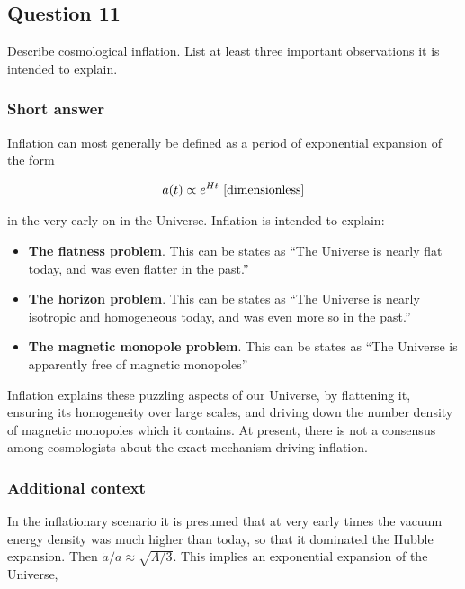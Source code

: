 \documentclass[a4paper,11pt]{article}
\begin{document}
\newpage
\subsection{Question 11}

Describe cosmological inflation. List at least three important observations it is intended to explain.

\subsubsection{Short answer}

Inflation can most generally be defined as a period of exponential expansion of the form

\begin{align*}
    a(t) \propto e^{Ht} ~ [{\rm dimensionless}]
\end{align*}

{\noindent}in the very early on in the Universe. Inflation is intended to explain:

\begin{itemize}
    \item \textbf{The flatness problem}. This can be states as ``The Universe is nearly flat today, and was even flatter in the past.'' 
    \item \textbf{The horizon problem}. This can be states as ``The Universe is nearly isotropic and homogeneous today, and was even more so in the past.''
    \item \textbf{The magnetic monopole problem}. This can be states as ``The Universe is apparently free of magnetic monopoles''
\end{itemize}

{\noindent}Inflation explains these puzzling aspects of our Universe, by flattening it, ensuring its homogeneity over large scales, and driving down the number density of magnetic monopoles which it contains. At present, there is not a consensus among cosmologists about the exact mechanism driving inflation.

\subsubsection{Additional context}

In the inflationary scenario it is presumed that at very early times the vacuum energy density was much higher than today, so that it dominated the Hubble expansion. Then $\dot{a}/a\approx\sqrt{\Lambda/3}$. This implies an exponential expansion of the Universe,
\end{document}
